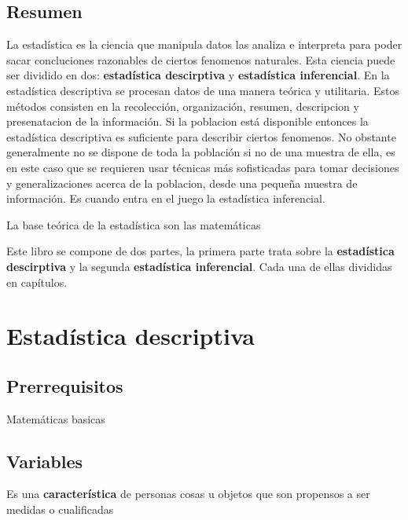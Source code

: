 \documentclass[10pt,]{krantz}
\theoremstyle{definition}
\theoremstyle{definition}
\theoremstyle{definition}
\theoremstyle{definition}
\theoremstyle{remark}
\begin{document}
\hypertarget{resumen}{%
\chapter*{Resumen}\label{resumen}}


La estadística es la ciencia que manipula datos las analiza e interpreta para poder sacar concluciones razonables de ciertos fenomenos naturales. Esta ciencia puede ser dividido en dos: \textbf{estadística descirptiva} y \textbf{estadística inferencial}. En la estadística descriptiva se procesan datos de una manera teórica y utilitaria. Estos métodos consisten en la recolección, organización, resumen, descripcion y presenatacion de la información. Si la poblacion está disponible entonces la estadística descriptiva es suficiente para describir ciertos fenomenos. No obstante generalmente no se dispone de toda la población si no de una muestra de ella, es en este caso que se requieren usar técnicas más sofisticadas para tomar decisiones y generalizaciones acerca de la poblacion, desde una pequeña muestra de información. Es cuando entra en el juego la estadística inferencial.

La base teórica de la estadística son las matemáticas

Este libro se compone de dos partes, la primera parte trata sobre la \textbf{estadística descirptiva} y la segunda \textbf{estadística inferencial}. Cada una de ellas divididas en capítulos.

\mainmatter

\hypertarget{part-estaduxedstica-descriptiva}{%
\part{Estadística descriptiva}\label{part-estaduxedstica-descriptiva}}

\hypertarget{prerrequisitos}{%
\chapter{Prerrequisitos}\label{prerrequisitos}}

Matemáticas basicas

\hypertarget{variables}{%
\chapter{Variables}\label{variables}}

Es una \textbf{característica} de personas cosas u objetos que son propensos a ser medidas o cualificadas
\end{document}
